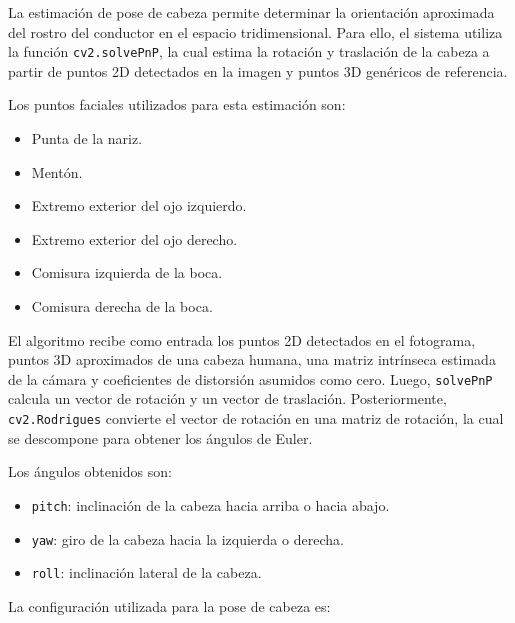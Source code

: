 \documentclass[conference]{IEEEtran}
\begin{document}
La estimación de pose de cabeza permite determinar la orientación aproximada del rostro del conductor en el espacio tridimensional. Para ello, el sistema utiliza la función \texttt{cv2.solvePnP}, la cual estima la rotación y traslación de la cabeza a partir de puntos 2D detectados en la imagen y puntos 3D genéricos de referencia.

Los puntos faciales utilizados para esta estimación son:

\begin{itemize}
    \item Punta de la nariz.
    
    \item Mentón.
    
    \item Extremo exterior del ojo izquierdo.
    
    \item Extremo exterior del ojo derecho.
    
    \item Comisura izquierda de la boca.
    
    \item Comisura derecha de la boca.
\end{itemize}

El algoritmo recibe como entrada los puntos 2D detectados en el fotograma, puntos 3D aproximados de una cabeza humana, una matriz intrínseca estimada de la cámara y coeficientes de distorsión asumidos como cero. Luego, \texttt{solvePnP} calcula un vector de rotación y un vector de traslación. Posteriormente, \texttt{cv2.Rodrigues} convierte el vector de rotación en una matriz de rotación, la cual se descompone para obtener los ángulos de Euler.

Los ángulos obtenidos son:

\begin{itemize}
    \item \texttt{pitch}: inclinación de la cabeza hacia arriba o hacia abajo.
    
    \item \texttt{yaw}: giro de la cabeza hacia la izquierda o derecha.
    
    \item \texttt{roll}: inclinación lateral de la cabeza.
\end{itemize}

La configuración utilizada para la pose de cabeza es:
\end{document}
